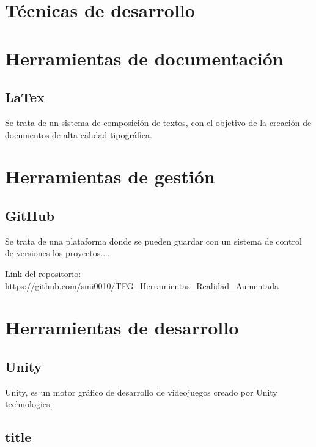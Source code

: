 

\section{Técnicas de desarrollo}

\section{Herramientas de documentación}
\subsection{LaTex}
Se trata de un sistema de composición de textos, con el objetivo de la creación de documentos de alta calidad tipográfica.
\section{Herramientas de gestión}
\subsection{GitHub}
Se trata de una plataforma donde se pueden guardar con un sistema de control de versiones los proyectos....

 Link del repositorio: \url{https://github.com/smi0010/TFG_Herramientas_Realidad_Aumentada}

\section{Herramientas de desarrollo}
\subsection{Unity}
Unity, es un motor gráfico de desarrollo de videojuegos creado por Unity technologies.

\subsection{title}
